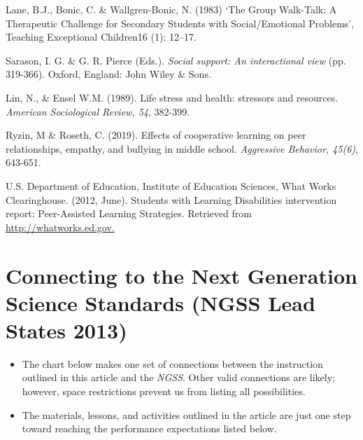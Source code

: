\documentclass[11pt]{sig-alternate}
\begin{document}
\begin{large}
Lane, B.J., Bonic, C. \& Wallgren-Bonic, N. (1983) ‘The Group Walk-Talk: A Therapeutic 
Challenge for Secondary Students with Social/Emotional Problems’, Teaching	 Exceptional Children16 (1): 12–17.

Sarason, I. G. \& G. R. Pierce (Eds.). \textit{Social support: An interactional view} (pp. 319-366). 
Oxford, England: John Wiley \& Sons.

Lin, N., \& Ensel W.M. (1989). Life stress and health: stressors and resources. \textit{American 
Sociological Review, 54}, 382-399.

Ryzin, M \& Roseth, C. (2019). Effects of cooperative learning on peer relationships, empathy, 
and bullying in middle school.\textit{ Aggressive Behavior, 45(6)}, 643-651.

U.S. Department of Education, Institute of Education Sciences, What Works Clearinghouse. 
(2012, June). Students with Learning Disabilities intervention report: Peer-Assisted Learning Strategies. Retrieved from \url{http://whatworks.ed.gov.}

\newpage

\section*{Connecting to the Next Generation Science Standards (NGSS Lead States 2013)}
\begin{itemize}
   \item The chart below makes one set of connections between the instruction outlined in this article and the \textit{NGSS}. Other valid connections are likely; however, space restrictions prevent us from listing all possibilities.
    \item The materials, lessons, and activities outlined in the article are just one step toward reaching the performance expectations listed below.
\end{itemize}


\end{large}
\end{document}
